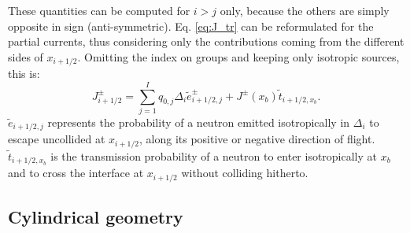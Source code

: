 \documentclass{ictt26}
\begin{document}
These quantities can be computed for $i > j$ only, because the others are simply opposite in sign (anti-symmetric). Eq. \ref{eq:J_tr} can be reformulated for the partial currents, thus considering only the contributions coming from the different sides of $x_{i+1/2}$. Omitting the index on groups and keeping only isotropic sources, this is:
\begin{equation}
\label{eq:pcslab}
  J^\pm_{i+1/2} = \sum_{j=1}^I{q_{0,j} \Delta_i \tilde{e}^\pm_{i+1/2,j} + J^\pm(x_b) \tilde{t}_{i+1/2, x_b}}.
\end{equation}
$\tilde{e}_{i+1/2, j}$ represents the probability of a neutron emitted isotropically in $\Delta_i$ to escape uncollided at $x_{i+1/2}$, along its positive or negative direction of flight. $\tilde{t}_{i+1/2, x_b}$ is the transmission probability of a neutron to enter isotropically at $x_b$ and to cross the interface at $x_{i+1/2}$ without colliding hitherto.


\subsection{Cylindrical geometry}
\label{sec:cylinder}
\end{document}
